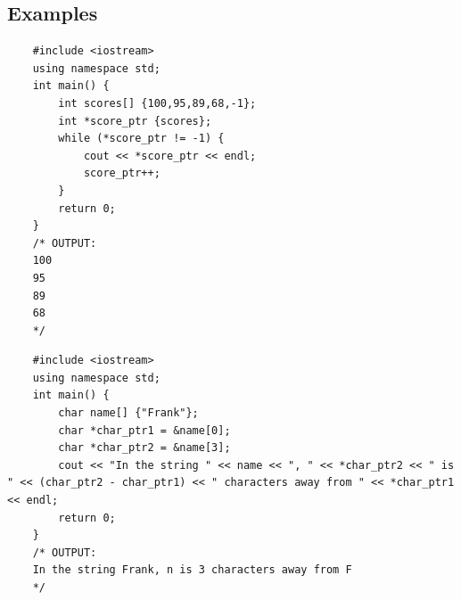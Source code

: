 \subsection{Examples}
\begin{verbatim}
    #include <iostream>
    using namespace std;
    int main() {
        int scores[] {100,95,89,68,-1};
        int *score_ptr {scores};
        while (*score_ptr != -1) {
            cout << *score_ptr << endl;
            score_ptr++;
        }
        return 0;
    }
    /* OUTPUT:
    100
    95
    89
    68
    */
\end{verbatim}

\begin{verbatim}
    #include <iostream>
    using namespace std;
    int main() {
        char name[] {"Frank"};
        char *char_ptr1 = &name[0];
        char *char_ptr2 = &name[3];
        cout << "In the string " << name << ", " << *char_ptr2 << " is " << (char_ptr2 - char_ptr1) << " characters away from " << *char_ptr1 << endl;
        return 0;
    }
    /* OUTPUT:
    In the string Frank, n is 3 characters away from F
    */
\end{verbatim}


